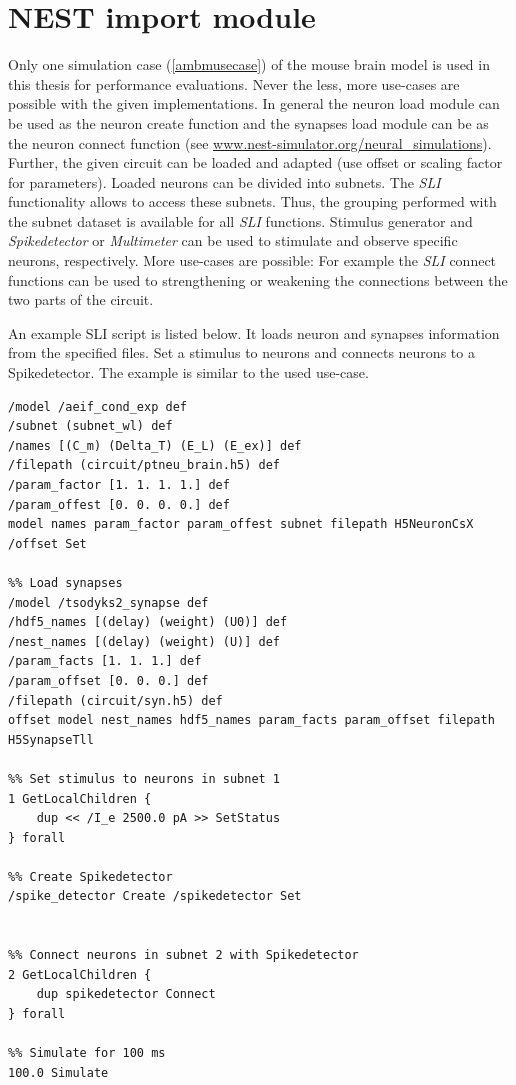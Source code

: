 \section{NEST import module}

Only one simulation case (\ref{ambmusecase}) of the mouse brain model is used in this thesis for performance evaluations.
Never the less, more use-cases are possible with the given implementations.
In general the neuron load module can be used as the neuron create function
and the synapses load module can be as the neuron connect function (see \url{www.nest-simulator.org/neural_simulations}).
Further, the given circuit can be loaded and adapted (use offset or scaling factor for parameters).
Loaded neurons can be divided into subnets. 
The \emph{SLI} functionality allows to access these subnets.
Thus, the grouping performed with the subnet dataset is available for all \emph{SLI} functions.
Stimulus generator and \emph{Spikedetector} or \emph{Multimeter} can be used to stimulate
and observe specific neurons, respectively.
More use-cases are possible: For example the \emph{SLI} connect functions can be used to strengthening or weakening the connections between the two
parts of the circuit.

An example SLI script is listed below.
It loads neuron and synapses information from the specified files.
Set a stimulus to neurons and connects neurons to a Spikedetector.
The example is similar to the used use-case.
\begin{lstlisting}[label=sliSynapses,caption=Example importing synapses]
%% Load neurons
/model /aeif_cond_exp def
/subnet (subnet_wl) def
/names [(C_m) (Delta_T) (E_L) (E_ex)] def
/filepath (circuit/ptneu_brain.h5) def
/param_factor [1. 1. 1. 1.] def
/param_offest [0. 0. 0. 0.] def
model names param_factor param_offest subnet filepath H5NeuronCsX /offset Set

%% Load synapses
/model /tsodyks2_synapse def
/hdf5_names [(delay) (weight) (U0)] def
/nest_names [(delay) (weight) (U)] def
/param_facts [1. 1. 1.] def
/param_offset [0. 0. 0.] def
/filepath (circuit/syn.h5) def
offset model nest_names hdf5_names param_facts param_offset filepath H5SynapseTll

%% Set stimulus to neurons in subnet 1
1 GetLocalChildren { 
    dup << /I_e 2500.0 pA >> SetStatus
} forall

%% Create Spikedetector
/spike_detector Create /spikedetector Set


%% Connect neurons in subnet 2 with Spikedetector
2 GetLocalChildren { 
    dup spikedetector Connect
} forall

%% Simulate for 100 ms
100.0 Simulate
\end{lstlisting}

